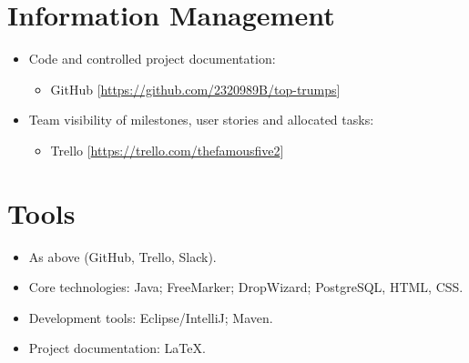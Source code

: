\documentclass[a4paper, 12pt, titlepage]{article}
\begin{document}
	\section{Information Management}
	\begin{itemize}
		\item Code and controlled project documentation:
		\begin{itemize}
			\item GitHub [\url{https://github.com/2320989B/top-trumps}]
		\end{itemize}

		\item Team visibility of milestones, user stories and allocated tasks:
		\begin{itemize}
			\item Trello [\url{https://trello.com/thefamousfive2}]
		\end{itemize}
	\end{itemize}

	\section{Tools}
	\begin{itemize}
		\item As above (GitHub, Trello, Slack).
		\item Core technologies: Java; FreeMarker; DropWizard; PostgreSQL, HTML, CSS.
		\item Development tools: Eclipse/IntelliJ; Maven.
		\item Project documentation: LaTeX.
	\end{itemize}
\end{document}
